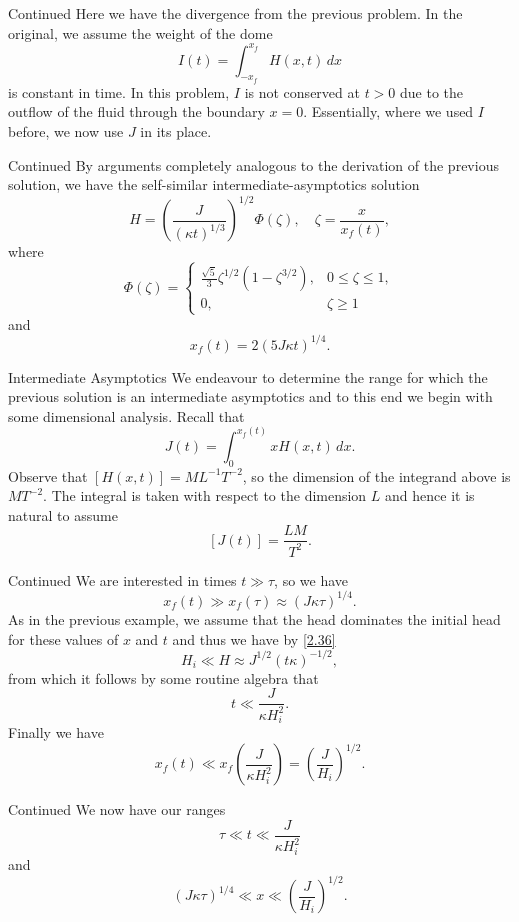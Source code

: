 \documentclass[10pt]{beamer}
\begin{document}
\begin{frame}{Continued}
  Here we have the divergence from the previous problem.
  In the original, we assume the weight of the dome $$I(t) = \int_{-x_f}^{x_f} H(x,t)\,dx$$ is constant in time.
  In this problem, $I$ is not conserved at $t > 0$ due to the outflow of the fluid through the boundary $x = 0$.
  Essentially, where we used $I$ before, we now use $J$ in its place.
\end{frame}

\begin{frame}{Continued}
  By arguments completely analogous to the derivation of the previous solution, we have the self-similar intermediate-asymptotics solution
  \begin{equation}
    \label{2.36}
    H = \left(\frac{J}{(\kappa t)^{1/3}}\right)^{1/2}\Phi(\zeta), \quad \zeta = \frac{x}{x_f(t)},
  \end{equation}
  where
  $$
  \Phi(\zeta) = \begin{cases}
    \frac{\sqrt{5}}{3}\zeta^{1/2}(1-\zeta^{3/2}), & 0 \leq \zeta \leq 1,\\
    0, & \zeta \geq 1
  \end{cases}
  $$
  and $$x_f(t) = 2(5J\kappa t)^{1/4}.$$
\end{frame}

\begin{frame}{Intermediate Asymptotics}
  We endeavour to determine the range for which the previous solution is an intermediate asymptotics and to this end we begin with some dimensional analysis.
  Recall that $$J(t) = \int_0^{x_f(t)} xH(x,t)\,dx.$$
  Observe that $[H(x,t)] = ML^{-1}T^{-2}$, so the dimension of the integrand above is $MT^{-2}$.
  The integral is taken with respect to the dimension $L$ and hence it is natural to assume  $$[J(t)]  = \frac{LM}{T^2}.$$ 
\end{frame}

\begin{frame}{Continued}
  We are interested in times $t \gg \tau$, so we have $$x_f(t) \gg x_f(\tau) \approx (J\kappa\tau)^{1/4}.$$
  As in the previous example, we assume that the head dominates the initial head for these values of $x$ and $t$ and thus we have by \eqref{2.36} 
  $$H_i \ll H \approx J^{1/2}(t\kappa)^{-1/2},$$ 
  from which it follows by some routine algebra that
  $$t \ll \frac{J}{\kappa H_i^2}.$$
  Finally we have $$x_f(t) \ll x_f\left(\frac{J}{\kappa H_i^2}\right) = \left(\frac{J}{H_i}\right)^{1/2}.$$
\end{frame}

\begin{frame}{Continued}
  We now have our ranges
  $$\tau \ll t \ll \frac{J}{\kappa H_i^2}$$
  and
  $$(J\kappa\tau)^{1/4} \ll x \ll \left(\frac{J}{H_i}\right)^{1/2}.$$
\end{frame}
\end{document}
